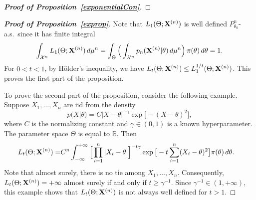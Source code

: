 \documentclass[11pt]{article}
\theoremstyle{plain}
\theoremstyle{definition}
\theoremstyle{remark}
\begin{document}
\begin{appendices}
\begin{proof}[\textbf{Proof of Proposition~\ref{exponentialCon}}]
\end{proof}

\begin{proof}[\textbf{Proof of Proposition~\ref{exprop}}]

Note that $L_1(\Theta;\mathbf{X}^{(n)})$ is well defined $P_{\theta_0}^n$-a.s.\ since it has finite integral
$$
\int_{\mathcal{X}^n} L_1(\Theta;\mathbf{X}^{(n)}) \, d\mu^n=
\int_{\Theta}\Big(\int_{\mathcal{X}^n} p_n(\mathbf{X}^{(n)}|\theta) \, d\mu^n \Big) \, \pi(\theta)\, d\theta=1.
$$
For $0<t<1$, by H\"older's inequality, we have $L_{t}(\Theta;\mathbf{X}^{(n)})\leq L_1^{1/t}(\Theta;\mathbf{X}^{(n)})$. This proves the first part of the proposition. 

To prove the second part of the proposition, consider the following example.
Suppose $X_1,\ldots,X_n$ are iid from the density
$$
    p(X|\theta)=C |X-\theta|^{-\gamma}\exp\big[-(X-\theta)^2\big]
,
$$
where $C$ is the normalizing constant and $\gamma\in(0,1)$ is a known hyperparameter. The parameter space $\Theta$ is equal to $\mathbb{R}$.
Then
$$
    \begin{aligned}
        L_t(\Theta;\mathbf{X}^{(n)})=&
    C^n \int_{-\infty}^{+\infty}
\Big[\prod_{i=1}^n |X_i-\theta|\Big]^{-t\gamma}
    \exp \big[-t\sum_{i=1}^n (X_i-\theta)^2 \big]
        \pi(\theta)
    \,
    d \theta.
    \end{aligned}
$$
Note that almost surely, there is no tie among $X_1,\ldots,X_n$. Consequently, $L_t(\Theta;\mathbf{X}^{(n)})=+\infty$ almost surely if and only if $t\geq \gamma^{-1}$.
Since $\gamma^{-1}\in (1,+\infty)$, this example shows that $L_t(\Theta;\mathbf{X}^{(n)})$ is not always well defined for $t>1$.

\end{proof}




\end{appendices}
\end{document}
